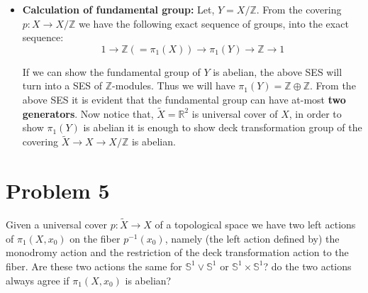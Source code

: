 \documentclass[11pt]{article}
\newcommand{\bb}[1]{\mathbb{#1}}
\newcommand{\Z}{\bb{Z}}
\newcommand{\R}{\mathbb{R}}
\newcommand{\s}{\bb{S}}
\begin{document}
\begin{itemize}
  \item \textbf{\textsf{Calculation of fundamental group: }} Let, $Y = X/\Z$. From the covering $p: X \to X/\Z$ we have the following exact sequence of groups, 
  into the exact sequence:
      $$
      1\to\mathbb{Z}( = \pi_1(X))\to\pi_1(Y)\to\mathbb{Z}\to1
      $$
  
  If we can show the fundamental group of $Y$ is abelian, the above SES will turn into a SES of $\Z$-modules. Thus we will have $\pi_1(Y)= \Z \oplus \Z$. From the above SES it is evident that the fundamental group can have at-most \textbf{two generators}. Now notice that, $\tilde{X} =\R^2$ is universal cover of $X$, in order to show $\pi_1(Y)$ is abelian it is enough to show deck transformation group of the covering $\tilde X \to X \to X/\Z$ is abelian. 

  \vspace*{0.2cm}
  
  
\end{itemize}



\section{Problem 5}

\begin{prob}{}{}
    Given a universal cover $p : \widetilde{X} \to X$ of a topological space we have two left actions of $\pi_1(X,x_0)$ on the fiber $p^{-1}(x_0)$, namely (the left action defined by) the monodromy action and the restriction of the deck transformation action to the fiber. Are these two actions the same for $\s^1 \vee \s^1$ or $\s^1 \times \s^1$? do the two actions always agree if $\pi_1(X,x_0)$ is abelian?
\end{prob}
\end{document}

